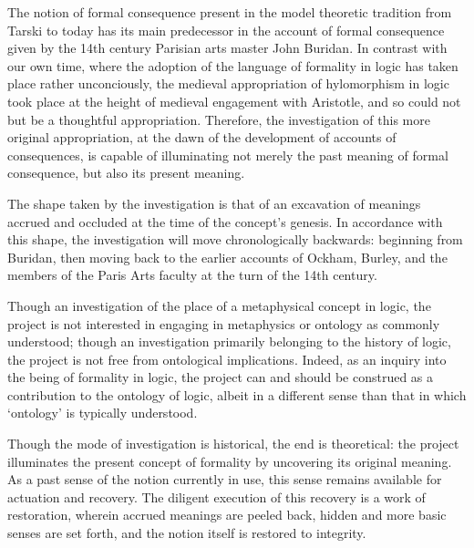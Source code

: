 \documentclass[]{article}
\begin{document}
The notion of formal consequence present in the model theoretic tradition from Tarski to today has its main predecessor in the account of formal consequence given by the 14th century Parisian arts master John Buridan. In contrast with our own time, where the adoption of the language of formality in logic has taken place rather unconciously, the medieval appropriation of hylomorphism in logic took place at the height of medieval engagement with Aristotle, and so could not but be a thoughtful appropriation. Therefore, the investigation of this more original appropriation, at the dawn of the development of accounts of consequences, is capable of illuminating not merely the past meaning of formal consequence, but also its present meaning. 

The shape taken by the investigation is that of an excavation of meanings accrued and occluded at the time of the concept's genesis. In accordance with this shape, the investigation will move chronologically backwards: beginning from Buridan, then moving back to the earlier accounts of Ockham, Burley, and the members of the Paris Arts faculty at the turn of the 14th century.

Though an investigation of the place of a metaphysical concept in logic, the project is not interested in engaging in metaphysics or ontology as commonly understood; though an investigation primarily belonging to the history of logic, the project is not free from ontological implications. Indeed, as an inquiry into the being of formality in logic, the project can and should be construed as a contribution to the ontology of logic, albeit in a different sense than that in which `ontology' is typically understood.

Though the mode of investigation is historical, the end is theoretical: the project illuminates the present concept of formality by uncovering its original meaning. As a past sense of the notion currently in use, this sense remains available for actuation and recovery. The diligent execution of this recovery is a work of restoration, wherein accrued meanings are peeled back, hidden and more basic senses are set forth, and the notion itself is restored to integrity.
\end{document}
